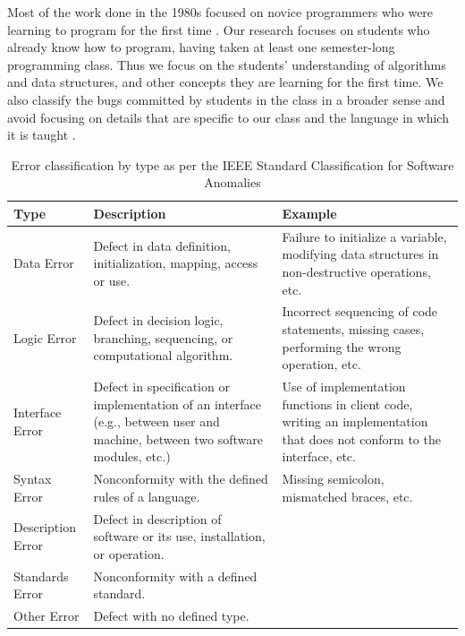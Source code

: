 \documentclass{sig-alternate}
\begin{document}
Most of the work done in the 1980s focused on novice programmers who
were learning to program for the first time
\cite{Pea86,SpohrerSoloway86}. Our research focuses on students who
already know how to program, having taken at least one semester-long
programming class. Thus we focus on the students' understanding of
algorithms and data structures, and other concepts they are learning
for the first time. We also classify the bugs committed by students in
the class in a broader sense and avoid focusing on details that are
specific to our class and the language in which it is taught
\cite{Arnold10}.\\

\begin{table}[t]
\def\arraystretch{1.6}
\centering
\caption{Error classification by type as per the IEEE Standard Classification for Software Anomalies \cite{IEEE10}}
\label{table:IEEE}
\begin{tabular}{|p{1in}|p{2.9in}|p{2.6in}|} \hline
\textbf{Type} & \textbf{Description} & \textbf{Example}\\ \hline
Data Error&
Defect in data definition, initialization, mapping, access or use.&
Failure to initialize a variable, modifying data structures in non-destructive operations, etc.\\ \hline

Logic Error&
Defect in decision logic, branching, sequencing, or computational algorithm.&
Incorrect sequencing of code statements, missing cases, performing the wrong operation, etc.\\ \hline

Interface Error&
Defect in specification or implementation of an interface (e.g., between user and machine, between two software modules, etc.)&
Use of implementation functions in client code, writing an implementation that does not conform to the interface, etc.\\ \hline

Syntax Error&
Nonconformity with the defined rules of a language.&
Missing semicolon, mismatched braces, etc.\\ \hline

Description Error&
Defect in description of software or its use, installation, or operation.&
\\ \hline

Standards Error&
Nonconformity with a defined standard.&
\\ \hline

Other Error&
Defect with no defined type.
&
\\ \hline
\end{tabular}
\end{table}
\end{document}

